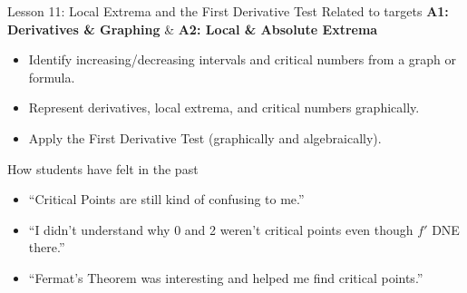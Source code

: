 \documentclass[dvipsnames]{beamer}
\begin{document}

\begin{frame}{Lesson 11: Local Extrema and the First Derivative Test}
Related to targets {\bf\color{RedOrange} A1: Derivatives \& Graphing} 
\& {\bf\color{RedOrange} A2: Local \& Absolute Extrema}

\vspace{0.5em}

\begin{itemize}
    \item Identify increasing/decreasing intervals and critical numbers from a graph or formula.
    \item Represent derivatives, local extrema, and critical numbers graphically.
    \item Apply the First Derivative Test (graphically and algebraically).
\end{itemize}
\end{frame}

\begin{frame}{How students have felt in the past}
\begin{itemize}
\item ``Critical Points are still kind of confusing to me.''
\item ``I didn't understand why 0 and 2 weren't critical points even though $f'$ DNE there.''
\item ``Fermat's Theorem was interesting and helped me find critical points.''
\end{itemize}
\end{frame}
\end{document}
